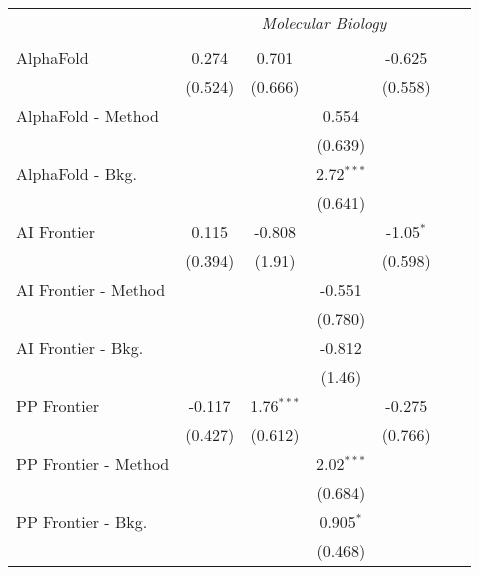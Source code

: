 \begin{tabular}{lcccccc}
 & \multicolumn{6}{c}{\textit{Molecular Biology}} \\ \\
   AlphaFold            & 0.274    & 0.701        &              & -0.625      &        &   \\   
                        & (0.524)  & (0.666)      &              & (0.558)     &        &   \\   
   AlphaFold - Method   &          &              & 0.554        &             &        &   \\   
                        &          &              & (0.639)      &             &        &   \\   
   AlphaFold - Bkg.     &          &              & 2.72$^{***}$ &             &        &   \\   
                        &          &              & (0.641)      &             &        &   \\   
   AI Frontier          & 0.115    & -0.808       &              & -1.05$^{*}$ &        &   \\   
                        & (0.394)  & (1.91)       &              & (0.598)     &        &   \\   
   AI Frontier - Method &          &              & -0.551       &             &        &   \\   
                        &          &              & (0.780)      &             &        &   \\   
   AI Frontier - Bkg.   &          &              & -0.812       &             &        &   \\   
                        &          &              & (1.46)       &             &        &   \\   
   PP Frontier          & -0.117   & 1.76$^{***}$ &              & -0.275      &        &   \\   
                        & (0.427)  & (0.612)      &              & (0.766)     &        &   \\   
   PP Frontier - Method &          &              & 2.02$^{***}$ &             &        &   \\   
                        &          &              & (0.684)      &             &        &   \\   
   PP Frontier - Bkg.   &          &              & 0.905$^{*}$  &             &        &   \\   
                        &          &              & (0.468)      &             &        &   \\   

\end{tabular}
